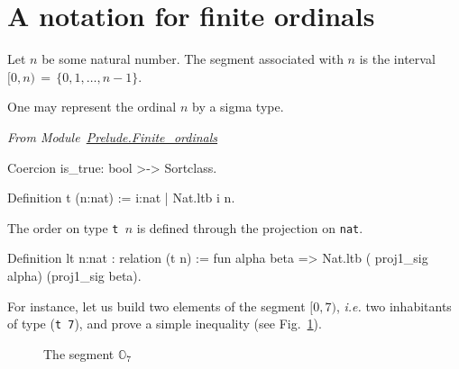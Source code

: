 \section{A notation for finite ordinals}


Let $n$ be some natural number. The segment associated with $n$ is the interval 
$[0,n)\,=\,\{0,1,\dots,n-1\}$. 

One may represent the ordinal $n$ by a sigma type.


\vspace{4pt}
\noindent\emph{From Module~\href{../src/html/hydras.Prelude.Finite_ordinals.html}{Prelude.Finite\_ordinals}}

\label{def: Finite-ord-type}
\begin{Coqsrc}
Coercion is_true: bool >-> Sortclass.

Definition t (n:nat) := {i:nat | Nat.ltb i  n}.
\end{Coqsrc}

The order on type \texttt{t $n$} is defined through the projection on \texttt{nat}.


\begin{Coqsrc}
Definition lt {n:nat} : relation (t n) :=
  fun alpha beta => Nat.ltb ( proj1_sig alpha) (proj1_sig beta).
\end{Coqsrc}

For instance, let us build two elements of the segment $[0, 7)$, \emph{i.e.} two
inhabitants of   type (\texttt{t 7}), and prove a simple  inequality (see Fig.~\ref{fig:O7}).

\begin{figure}[h]
\centering
{}

\caption{The segment $\mathbb{O}_7$\label{fig:O7}}
\end{figure}
  

